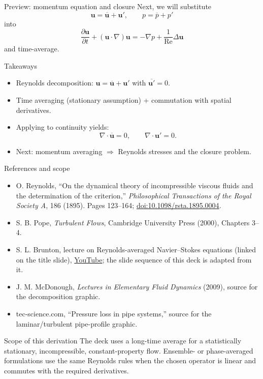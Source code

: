 \documentclass[aspectratio=169,11pt]{beamer}
\newcommand{\uu}{\bm{u}}
\newcommand{\pp}{p}
\newcommand{\Rey}{\mathrm{Re}}
\newcommand{\avg}[1]{\overline{#1}}
\renewcommand{\up}{\uu'} %
\newcommand{\ubar}{\avg{\uu}}
\begin{document}
\begin{frame}{Preview: momentum equation and closure}
Next, we will substitute
\[
\uu=\ubar+\up,\qquad \pp=\avg{\pp}+\pp'
\]
into
\[
\frac{\partial \uu}{\partial t} + (\uu\cdot\nabla)\uu = -\nabla \pp + \frac{1}{\Rey}\Delta\uu
\]
and time-average.

\end{frame}

\begin{frame}{Takeaways}
\begin{itemize}
  \item Reynolds decomposition: $\uu=\ubar+\up$ with $\avg{\up}=0$.
  \item Time averaging (stationary assumption) + commutation with spatial derivatives.
  \item Applying to continuity yields:
  \[
  \nabla\cdot\ubar=0,\qquad \nabla\cdot\up=0.
  \]
  \item Next: momentum averaging $\Rightarrow$ Reynolds stresses and the closure problem.
\end{itemize}
\end{frame}

\begin{frame}{References and scope}
\small
\begin{itemize}
  \item O. Reynolds, ``On the dynamical theory of incompressible viscous fluids and the determination of the criterion,'' \emph{Philosophical Transactions of the Royal Society A}, 186 (1895).
  Pages 123--164; \href{https://doi.org/10.1098/rsta.1895.0004}{doi:10.1098/rsta.1895.0004}.
  \item S. B. Pope, \emph{Turbulent Flows}, Cambridge University Press (2000), Chapters 3--4.
  \item S. L. Brunton, lecture on Reynolds-averaged Navier--Stokes equations (linked on the title slide), \href{https://www.youtube.com/watch?v=mDt-HJEXK6g}{YouTube}; the slide sequence of this deck is adapted from it.
  \item J. M. McDonough, \emph{Lectures in Elementary Fluid Dynamics} (2009), source for the decomposition graphic.
  \item tec-science.com, ``Pressure loss in pipe systems,'' source for the laminar/turbulent pipe-profile graphic.
\end{itemize}

\begin{block}{Scope of this derivation}
The deck uses a long-time average for a statistically stationary, incompressible, constant-property flow. Ensemble- or phase-averaged formulations use the same Reynolds rules when the chosen operator is linear and commutes with the required derivatives.
\end{block}
\end{frame}
\end{document}
